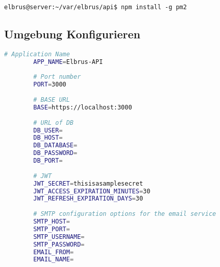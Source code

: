 \documentclass{article}
\begin{document}
	\begin{lstlisting}[caption={Installieren von 'pm2'.}]
		elbrus@server:~/var/elbrus/api$ npm install -g pm2
	\end{lstlisting}

	\newpage
	\subsection[file config]{Umgebung Konfigurieren}
	
	\lstset{style=files}
	\begin{lstlisting}[caption={Anhand von '.env.example' eigene '.env' Datei anlegen.}, language=bash]
		# Application Name
		APP_NAME=Elbrus-API
		
		# Port number
		PORT=3000
		
		# BASE URL
		BASE=https://localhost:3000
		
		# URL of DB
		DB_USER=
		DB_HOST=
		DB_DATABASE=
		DB_PASSWORD=
		DB_PORT=
		
		# JWT
		JWT_SECRET=thisisasamplesecret
		JWT_ACCESS_EXPIRATION_MINUTES=30
		JWT_REFRESH_EXPIRATION_DAYS=30
		
		# SMTP configuration options for the email service
		SMTP_HOST=
		SMTP_PORT=
		SMTP_USERNAME=
		SMTP_PASSWORD=
		EMAIL_FROM=
		EMAIL_NAME=
	\end{lstlisting}
	\lstset{style=commands}
\end{document}
